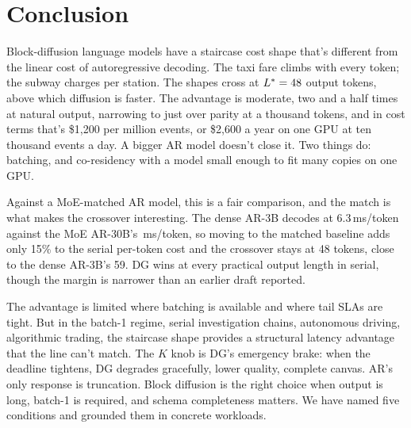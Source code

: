 \section{Conclusion}
\label{sec:conclusion}

Block-diffusion language models have a staircase cost shape that's
different from the linear cost of autoregressive decoding.
The taxi fare climbs with every token; the subway charges per station.
The shapes cross at $L^{*} = 48$ output tokens, above which
diffusion is faster. The advantage is moderate, two and a half times at natural
output, narrowing to just over parity at a thousand tokens, and in cost terms that's
\$1{,}200 per million events, or \$2{,}600 a year on one GPU at ten
thousand events a day. A bigger AR model doesn't close it. Two things
do: batching, and co-residency with a model small enough to fit many
copies on one GPU.

Against a MoE-matched AR model, this is a fair comparison, and the
match is what makes the crossover interesting. The dense AR-3B decodes
at 6.3\,ms/token against the MoE AR-30B's \arSlope\,ms/token, so moving
to the matched baseline adds only 15\% to the serial per-token cost and
the crossover stays at 48 tokens, close to the dense AR-3B's 59.
DG wins at every practical output length in serial, though the margin
is narrower than an earlier draft reported.

The advantage is limited where batching is available and where tail
SLAs are tight. But in the batch-1 regime, serial investigation
chains, autonomous driving, algorithmic trading, the staircase
shape provides a structural latency advantage that the line can't
match. The $K$ knob is DG's emergency brake: when the deadline
tightens, DG degrades gracefully, lower quality, complete canvas.
AR's only response is truncation. Block diffusion is the right choice
when output is long, batch-1 is required, and schema completeness
matters. We have named five conditions and grounded them in concrete
workloads.

